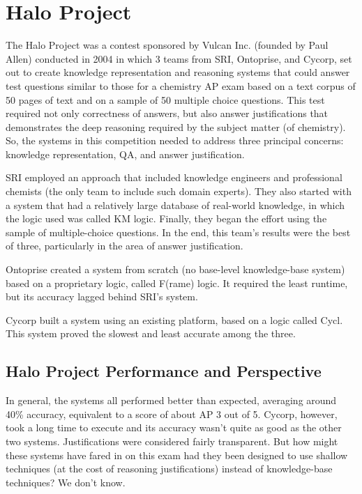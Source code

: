\section{Halo Project}

The Halo Project \cite{friedland2004project} was a contest sponsored by Vulcan Inc. (founded by Paul Allen) conducted in 2004 in which 3 teams from SRI, Ontoprise, and Cycorp, set out to create knowledge representation and reasoning systems that could answer test questions similar to those for a chemistry AP exam based on a text corpus of 50 pages of text and on a sample of 50 multiple choice questions.  This test required not only correctness of answers, but also answer justifications that demonstrates the deep reasoning required by the subject matter (of chemistry).  So, the systems in this competition needed to address three principal concerns:  knowledge representation, QA, and answer justification. 

SRI employed an approach that included knowledge engineers and 
professional chemists (the only team to include such domain experts).
They also started with a system that had a relatively large database
of real-world knowledge, in which the logic used was called KM logic.
Finally, they began the effort using the sample of multiple-choice questions.  In the end, this team's results were the best of three, particularly in the area of answer justification.

Ontoprise created a system from scratch (no base-level knowledge-base system) based on a proprietary logic, called F(rame) logic.  It required the least runtime, but its accuracy lagged behind SRI's system.

Cycorp built a system using an existing platform, based on a logic called Cycl.  This system proved the slowest and least accurate among the three.

\subsection{Halo Project Performance and Perspective}

In general, the systems all performed better than expected, averaging around 40\% accuracy, equivalent to a score of about AP 3 out of 5.  Cycorp, however, took a long time to execute and its accuracy wasn't quite as good as the other two systems.  Justifications were considered fairly transparent.  But how might these systems have fared in on this exam had they been designed to use shallow techniques (at the cost of reasoning justifications) instead of knowledge-base techniques?  We don't know.



